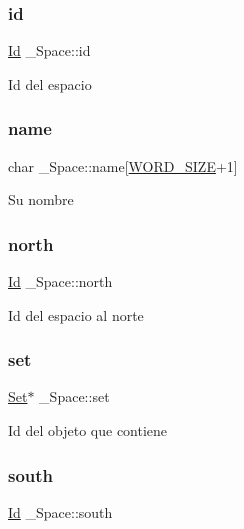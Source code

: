\subsubsection{\texorpdfstring{id}{id}}
{\footnotesize\ttfamily \hyperlink{types_8h_a845e604fb28f7e3d97549da3448149d3}{Id} \+\_\+\+Space\+::id}

Id del espacio \mbox{\label{struct__Space_aa1c9c994c2d16ecf3ef46138685fdfdc}} 
\subsubsection{\texorpdfstring{name}{name}}
{\footnotesize\ttfamily char \+\_\+\+Space\+::name\mbox{[}\hyperlink{types_8h_a92ed8507d1cd2331ad09275c5c4c1c89}{W\+O\+R\+D\+\_\+\+S\+I\+ZE}+1\mbox{]}}

Su nombre \mbox{\label{struct__Space_ae5ebe53ce79514d7d2d93911e0159252}} 
\subsubsection{\texorpdfstring{north}{north}}
{\footnotesize\ttfamily \hyperlink{types_8h_a845e604fb28f7e3d97549da3448149d3}{Id} \+\_\+\+Space\+::north}

Id del espacio al norte \mbox{\label{struct__Space_a115dbdeddf8b1e12889b4ab99945995d}} 
\subsubsection{\texorpdfstring{set}{set}}
{\footnotesize\ttfamily \hyperlink{set_8h_a6d3b7f7c92cbb4577ef3ef7ddbf93161}{Set}$\ast$ \+\_\+\+Space\+::set}

Id del objeto que contiene \mbox{\label{struct__Space_a646b68c22a0bbf1685033c96109d31d1}} 
\subsubsection{\texorpdfstring{south}{south}}
{\footnotesize\ttfamily \hyperlink{types_8h_a845e604fb28f7e3d97549da3448149d3}{Id} \+\_\+\+Space\+::south}

